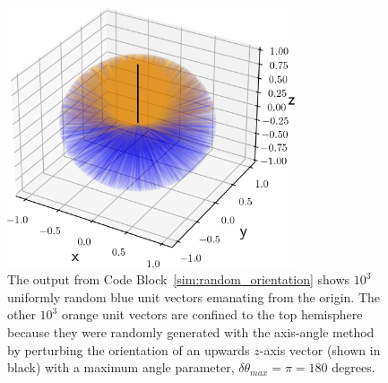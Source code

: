 \documentclass[
  9pt,
  bestpractices,
]{livecoms}
\begin{document}
\begin{figure}

\end{figure}

\begin{figure}

\end{figure}

\begin{figure}

\end{figure}

\begin{figure}
\begin{centering}
\includegraphics[width=8.5cm]{../figures/random_orientation.png}
\caption{
The output from Code Block~\ref{sim:random_orientation} shows $10^3$ uniformly random blue unit vectors emanating from the origin.
The other $10^3$ orange unit vectors are confined to the top hemisphere because they were randomly generated with the axis-angle method by perturbing the orientation of an upwards $z$-axis vector (shown in black) with a maximum angle parameter, $\delta \theta_{max}=\pi=180$ degrees.
\label{fig:random_orientation}
}
\end{centering}
\end{figure}
\end{document}
